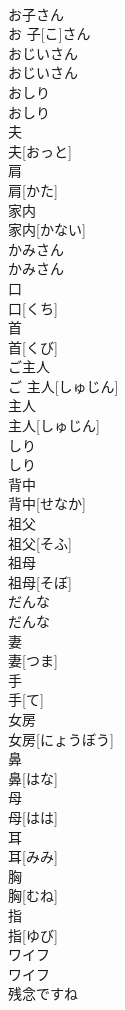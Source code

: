 \documentclass[8pt]{extreport}
\begin{document}
\begin{CJK}{UTF8}{min}
\\	お子さん	
\\	お 子[こ]さん
\\	おじいさん	
\\	おじいさん
\\	おしり	
\\	おしり
\\	夫	
\\	夫[おっと]
\\	肩	
\\	肩[かた]
\\	家内	
\\	家内[かない]
\\	かみさん	
\\	かみさん
\\	口	
\\	口[くち]
\\	首	
\\	首[くび]
\\	ご主人	
\\	ご 主人[しゅじん]
\\	主人	
\\	主人[しゅじん]
\\	しり	
\\	しり
\\	背中	
\\	背中[せなか]
\\	祖父	
\\	祖父[そふ]
\\	祖母	
\\	祖母[そぼ]
\\	だんな	
\\	だんな
\\	妻	
\\	妻[つま]
\\	手	
\\	手[て]
\\	女房	
\\	女房[にょうぼう]
\\	鼻	
\\	鼻[はな]
\\	母	
\\	母[はは]
\\	耳	
\\	耳[みみ]
\\	胸	
\\	胸[むね]
\\	指	
\\	指[ゆび]
\\	ワイフ	
\\	ワイフ
\\	残念ですね	

\end{CJK}
\end{document}
